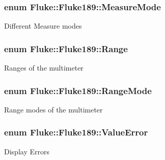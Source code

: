 \hypertarget{classFluke_1_1Fluke189_a9122f47da123e82f492c9cfcb29e5f2e}{
\subsubsection[{MeasureMode}]{\setlength{\rightskip}{0pt plus 5cm}enum {\bf Fluke::Fluke189::MeasureMode}}}
\label{classFluke_1_1Fluke189_a9122f47da123e82f492c9cfcb29e5f2e}
Different Measure modes \hypertarget{classFluke_1_1Fluke189_a8112c52d8588d0cce468376e2faa83f5}{
\subsubsection[{Range}]{\setlength{\rightskip}{0pt plus 5cm}enum {\bf Fluke::Fluke189::Range}}}
\label{classFluke_1_1Fluke189_a8112c52d8588d0cce468376e2faa83f5}
Ranges of the multimeter \hypertarget{classFluke_1_1Fluke189_a470ac0e0a6e44ca3b33d2307ef29f37d}{
\subsubsection[{RangeMode}]{\setlength{\rightskip}{0pt plus 5cm}enum {\bf Fluke::Fluke189::RangeMode}}}
\label{classFluke_1_1Fluke189_a470ac0e0a6e44ca3b33d2307ef29f37d}
Range modes of the multimeter \hypertarget{classFluke_1_1Fluke189_a5dc0eaffde0a29a64cbcbd50d4178491}{
\subsubsection[{ValueError}]{\setlength{\rightskip}{0pt plus 5cm}enum {\bf Fluke::Fluke189::ValueError}}}
\label{classFluke_1_1Fluke189_a5dc0eaffde0a29a64cbcbd50d4178491}
Display Errors 

